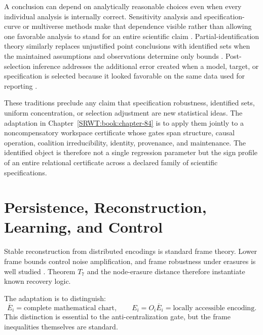 
A conclusion can depend on analytically reasonable choices even when every
individual analysis is internally correct. Sensitivity analysis and
specification-curve or multiverse methods make that dependence visible rather
than allowing one favorable analysis to stand for an entire scientific claim
\cite{SRWT:Leamer1983,SRWT:SteegenEtAl2016,SRWT:SimonsohnEtAl2020}. Partial-identification
theory similarly replaces unjustified point conclusions with identified sets
when the maintained assumptions and observations determine only bounds
\cite{SRWT:Manski2003,SRWT:ImbensManski2004}. Post-selection inference addresses the
additional error created when a model, target, or specification is selected
because it looked favorable on the same data used for reporting
\cite{SRWT:BerkEtAl2013}.

These traditions preclude any claim that specification robustness, identified
sets, uniform concentration, or selection adjustment are new statistical
ideas. The adaptation in Chapter~\ref{SRWT:book:chapter-84} is to apply them jointly to a
noncompensatory workspace certificate whose gates span structure, causal
operation, coalition irreducibility, identity, provenance, and maintenance.
The identified object is therefore not a single regression parameter but the
sign profile of an entire relational certificate across a declared family of
scientific specifications.

\section{Persistence, Reconstruction, Learning, and Control}


Stable reconstruction from distributed encodings is standard frame theory.
Lower frame bounds control noise amplification, and frame robustness under
erasures is well studied \cite{SRWT:CasazzaKovacevic2003,SRWT:Christensen2016}. Theorem
\(T_7\) and the node-erasure distance therefore instantiate known recovery
logic.

The adaptation is to distinguish:
\[
\overline E_i
=
\text{complete mathematical chart},
\qquad
E_i=O_i\overline E_i
=
\text{locally accessible encoding}.
\]
This distinction is essential to the anti-centralization gate, but the frame
inequalities themselves are standard.


